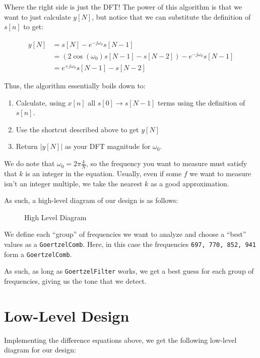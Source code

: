 \documentclass[12pt]{article}
\begin{document}
Where the right side is just the DFT! The power of this 
algorithm is that we want to just calculate $y[N]$, but notice that
we can substitute the definition of $s[n]$ to get:

\begin{align*}
    y[N] &= s[N] - e^{-j\omega_0}s[N-1] \\
    &= (2\cos(\omega_0)s[N-1] - s[N-2]) - e^{-j\omega_0}s[N-1] \\
    &= e^{+j\omega_0}s[N-1] - s[N-2] 
\end{align*}

Thus, the algorithm essentially boils down to:

\begin{enumerate}
    \item Calculate, using $x[n]$ all $s[0] \to s[N-1]$ terms using the definition of $s[n]$. 
    \item Use the shortcut described above to get $y[N]$
    \item Return $|y[N]|$ as your DFT magnitude for $\omega_0$.
\end{enumerate}

We do note that $\omega_0 = 2\pi \frac{k}{N}$, so the frequency 
you want to measure must satisfy that $k$ is an integer in the equation.
Usually, even if some $f$ we want to measure isn't an integer 
multiple, we take the nearest $k$ as a good approximation. 

As such, a high-level diagram of our design is as follows:

\begin{figure}[H]
    \centering 
    
    \caption{High Level Diagram}
    \label{fig:high-level}
\end{figure}

We define each ``group'' of frequencies we want to analyze and 
choose a ``best'' values as a \texttt{GoertzelComb}. Here, in 
this case the frequencies \texttt{697, 770, 852, 941} form a 
\texttt{GoertzelComb}.

As such, as long as \texttt{GoertzelFilter} works, we get 
a best guess for each group of frequencies, giving us the tone 
that we detect. 

\section*{Low-Level Design}

Implementing the difference equations above, we get the 
following low-level diagram for our design:
\end{document}
